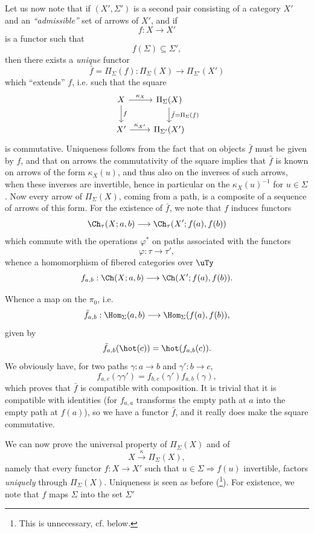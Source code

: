 Let us now note that if $(X', \Sigma')$ is a second pair consisting of a category $X'$ and an \textit{``admissible''} set of arrows of $X'$, and if
\[
f : X \longrightarrow X'
\]
is a functor such that
\[
f(\Sigma) \subseteq \Sigma',
\]
then there exists a \textit{unique} functor
\[
\bar{f} = \Pi_\Sigma(f) : \Pi_\Sigma(X) \longrightarrow \Pi_{\Sigma'}(X')
\]
which ``extends'' $f$, i.e. such that the square
\[
\begin{tikzcd}
X \arrow[r, "\kappa_X"] \arrow[d, "{\scriptstyle f}"] & \Pi_\Sigma(X) \arrow[d, "{\scriptstyle \bar{f} = \Pi_\Sigma(f)}"] \\
X' \arrow[r, "\kappa_{X'}"] & \Pi_{\Sigma'}(X')
\end{tikzcd}
\]
is commutative. Uniqueness follows from the fact that on objects $\bar{f}$ must be given by $f$, and that on arrows the commutativity of the square implies that $\bar{f}$ is known on arrows of the form $\kappa_X(u)$, and thus also on the inverses of such arrows, when these inverses are invertible, hence in particular on the $\kappa_X(u)^{-1}$ for $u \in \Sigma$. Now every arrow of $\Pi_\Sigma(X)$, coming from a path, is a composite of a sequence of arrows of this form. For the existence of $\bar{f}$, we note that $f$ induces functors %
\[
\Ch_\tau(X; a, b) \longrightarrow \Ch_\tau(X'; f(a), f(b))
\]
which commute with the operations $\varphi^*$ on paths associated with the functors
\[
\varphi : \tau \longrightarrow \tau',
\]
whence a homomorphism of fibered categories over $\uTy$
\[
f_{a,b} : \Ch(X; a, b) \longrightarrow \Ch(X'; f(a), f(b)).
\]


Whence a map on the $\pi_0$, i.e.
\[
\bar{f}_{a,b} : \Hom_\Sigma(a,b) \longrightarrow \Hom_\Sigma(f(a), f(b)),
\]
given by
\[
\bar{f}_{a,b}(\hot(c)) = \hot(f_{a,b}(c)).
\]
We obviously have, for two paths $\gamma : a \longrightarrow b$ and $\gamma' : b \longrightarrow c$,
\[
f_{a,c}(\gamma\gamma') = f_{b,c}(\gamma')f_{a,b}(\gamma),
\]
which proves that $\bar{f}$ is compatible with composition. It is trivial that it is compatible with identities (for $f_{a,a}$ transforms the empty path at $a$ into the empty path at $f(a)$), so we have a functor $\bar{f}$, and it really does make the square commutative.

We can now prove the universal property of $\Pi_\Sigma(X)$ and of
\[
X \xrightarrow{\ \kappa\ } \Pi_\Sigma(X),
\]
namely that every functor $f : X \longrightarrow X'$ such that $u \in \Sigma \Longrightarrow f(u)$ invertible, factors \textit{uniquely} through $\Pi_\Sigma(X)$. Uniqueness is seen as before (\footnote[20]{This is unnecessary, cf. below.}). For existence, we note that $f$ maps $\Sigma$ into the set $\Sigma'$